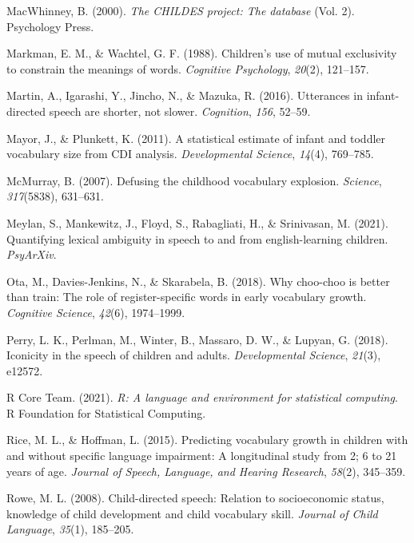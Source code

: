 \documentclass[10pt, letterpaper]{article}
\newenvironment{CSLReferences}%
  {}%
  {\par}
\begin{document}
\begin{CSLReferences}
\leavevmode\hypertarget{ref-macwhinney2000childes}{}%
MacWhinney, B. (2000). \emph{The CHILDES project: The database} (Vol.
2). Psychology Press.

\leavevmode\hypertarget{ref-markman1988children}{}%
Markman, E. M., \& Wachtel, G. F. (1988). Children's use of mutual
exclusivity to constrain the meanings of words. \emph{Cognitive
Psychology}, \emph{20}(2), 121--157.

\leavevmode\hypertarget{ref-martin2016utterances}{}%
Martin, A., Igarashi, Y., Jincho, N., \& Mazuka, R. (2016). Utterances
in infant-directed speech are shorter, not slower. \emph{Cognition},
\emph{156}, 52--59.

\leavevmode\hypertarget{ref-mayor2011statistical}{}%
Mayor, J., \& Plunkett, K. (2011). A statistical estimate of infant and
toddler vocabulary size from CDI analysis. \emph{Developmental Science},
\emph{14}(4), 769--785.

\leavevmode\hypertarget{ref-mcmurray2007defusing}{}%
McMurray, B. (2007). Defusing the childhood vocabulary explosion.
\emph{Science}, \emph{317}(5838), 631--631.

\leavevmode\hypertarget{ref-meylan2021quantifying}{}%
Meylan, S., Mankewitz, J., Floyd, S., Rabagliati, H., \& Srinivasan, M.
(2021). Quantifying lexical ambiguity in speech to and from
english-learning children. \emph{PsyArXiv}.

\leavevmode\hypertarget{ref-ota2018choo}{}%
Ota, M., Davies-Jenkins, N., \& Skarabela, B. (2018). Why choo-choo is
better than train: The role of register-specific words in early
vocabulary growth. \emph{Cognitive Science}, \emph{42}(6), 1974--1999.

\leavevmode\hypertarget{ref-perry2018iconicity}{}%
Perry, L. K., Perlman, M., Winter, B., Massaro, D. W., \& Lupyan, G.
(2018). Iconicity in the speech of children and adults.
\emph{Developmental Science}, \emph{21}(3), e12572.

\leavevmode\hypertarget{ref-r2021}{}%
R Core Team. (2021). \emph{R: A language and environment for statistical
computing}. R Foundation for Statistical Computing.

\leavevmode\hypertarget{ref-rice2015predicting}{}%
Rice, M. L., \& Hoffman, L. (2015). Predicting vocabulary growth in
children with and without specific language impairment: A longitudinal
study from 2; 6 to 21 years of age. \emph{Journal of Speech, Language,
and Hearing Research}, \emph{58}(2), 345--359.

\leavevmode\hypertarget{ref-rowe2008child}{}%
Rowe, M. L. (2008). Child-directed speech: Relation to socioeconomic
status, knowledge of child development and child vocabulary skill.
\emph{Journal of Child Language}, \emph{35}(1), 185--205.


\end{CSLReferences}
\end{document}
